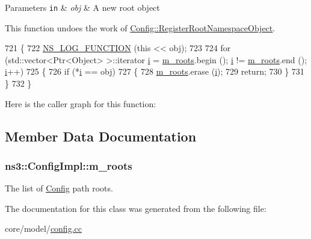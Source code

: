 \begin{DoxyParams}[1]{Parameters}
\mbox{\tt in}  & {\em obj} & A new root object\\
\hline
\end{DoxyParams}
This function undoes the work of \hyperlink{group__config_gadf663c596f54bed678e83cccd4e3d9d5}{Config\+::\+Register\+Root\+Namespace\+Object}. 
\begin{DoxyCode}
721 \{
722   \hyperlink{log-macros-disabled_8h_a90b90d5bad1f39cb1b64923ea94c0761}{NS\_LOG\_FUNCTION} (\textcolor{keyword}{this} << obj);
723 
724   \textcolor{keywordflow}{for} (std::vector<Ptr<Object> >::iterator \hyperlink{bernuolliDistribution_8m_a6f6ccfcf58b31cb6412107d9d5281426}{i} = \hyperlink{classns3_1_1ConfigImpl_a54380ef7cb5b032793df59ecb3365dd3}{m\_roots}.begin (); \hyperlink{bernuolliDistribution_8m_a6f6ccfcf58b31cb6412107d9d5281426}{i} != 
      \hyperlink{classns3_1_1ConfigImpl_a54380ef7cb5b032793df59ecb3365dd3}{m\_roots}.end (); \hyperlink{bernuolliDistribution_8m_a6f6ccfcf58b31cb6412107d9d5281426}{i}++)
725     \{
726       \textcolor{keywordflow}{if} (*\hyperlink{bernuolliDistribution_8m_a6f6ccfcf58b31cb6412107d9d5281426}{i} == obj)
727         \{
728           \hyperlink{classns3_1_1ConfigImpl_a54380ef7cb5b032793df59ecb3365dd3}{m\_roots}.erase (\hyperlink{bernuolliDistribution_8m_a6f6ccfcf58b31cb6412107d9d5281426}{i});
729           \textcolor{keywordflow}{return};
730         \}
731     \}
732 \}
\end{DoxyCode}


Here is the caller graph for this function\+:




\subsection{Member Data Documentation}
\subsubsection[{\texorpdfstring{m\+\_\+roots}{m_roots}}]{ ns3\+::\+Config\+Impl\+::m\+\_\+roots\hspace{0.3cm}{\ttfamily [private]}}\hypertarget{classns3_1_1ConfigImpl_a54380ef7cb5b032793df59ecb3365dd3}{}\label{classns3_1_1ConfigImpl_a54380ef7cb5b032793df59ecb3365dd3}
The list of \hyperlink{namespacens3_1_1Config}{Config} path roots. 

The documentation for this class was generated from the following file\+:\begin{DoxyCompactItemize}
\item 
core/model/\hyperlink{config_8cc}{config.\+cc}\end{DoxyCompactItemize}
